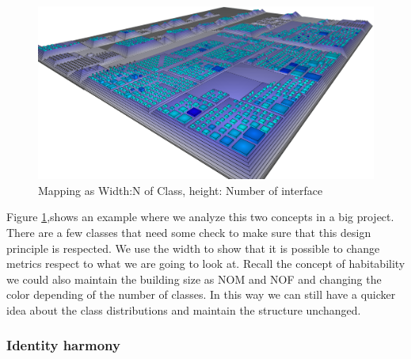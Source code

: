 \documentclass[]{usiinfbachelorproject}
\begin{document}
\begin{figure}
\centering
\includegraphics[width=.60\textwidth]{images/ClassesAndInterfaces}
\caption[Classes and Interfaces Mapping]{Mapping as Width:N of Class, height: Number of interface \label{fig:classInterface}
}
	
\end{figure}

Figure \ref{fig:classInterface},shows an example where we analyze this two concepts in a big project. There are a few classes that need some check to make sure that this design principle is respected. We use the width to show that it is possible to change metrics respect to what we are going to look at. Recall the concept of habitability \cite{programComp} we could also maintain the building size as NOM and NOF and changing the color depending of the number of classes. In this way we can still have a quicker idea about the class distributions and maintain the structure unchanged. 


\subsubsection{Identity harmony	}\label{sec:idHarmony}
\end{document}
